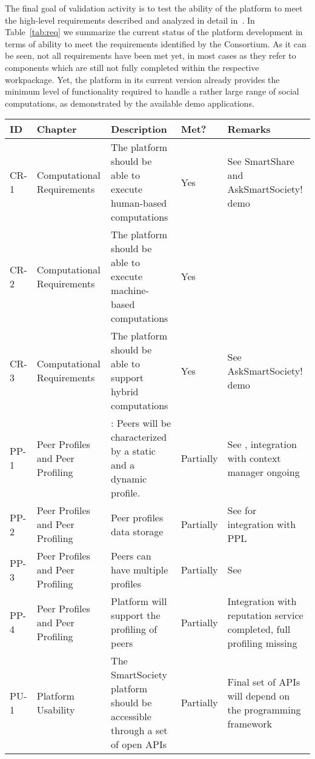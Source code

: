 The final goal of validation activity is to test the ability of the platform to meet the high-level requirements %
described and analyzed in detail in~\cite{D8.1}. In Table~\ref{tab:req} we summarize the current status of the platform development in terms of ability to meet the requirements identified by the Consortium. As it can be seen, not all requirements have been met yet, in most cases as they refer to components which are still not fully completed within the respective workpackage. Yet, the platform in its current version already provides the minimum level of functionality required to handle a rather large range of social computations, as demonstrated by the available demo applications.

\begin{sidewaystable}
{\footnotesize \begin{tabular}{|p{1.2cm}|p{4cm}|p{6.5cm}|p{1.8cm}|p{5.4cm}|}
\hline \hline
ID & Chapter & Description & Met? & Remarks \\
\hline \hline
CR-1 & Computational Requirements & The platform should be able to execute human-based computations & Yes & See SmartShare and AskSmartSociety! demo\\  \hline
CR-2 & Computational Requirements & The platform should be able to execute machine-based computations & Yes & \\ \hline
CR-3 & Computational Requirements & The platform should be able to support hybrid computations & Yes & See AskSmartSociety! demo\\ \hline
PP-1 & Peer Profiles and Peer Profiling &: Peers will be characterized by a static and a dynamic profile. & Partially & See \cite{D4.1,D4.2,D4.3}, integration with context manager ongoing\\ \hline
PP-2 & Peer Profiles and Peer Profiling & Peer profiles data storage & Partially & See \cite{D4.3}  for integration with PPL\\ \hline
PP-3 & Peer Profiles and Peer Profiling & Peers can have multiple profiles & Partially & See \cite{D4.2,D4.3}\\ \hline
PP-4 &Peer Profiles and Peer Profiling  & Platform will support the profiling of peers & Partially & Integration with reputation service completed, full profiling missing\\ \hline
PU-1 & Platform Usability & The SmartSociety platform should be accessible through a set of open APIs & Partially & Final set of APIs will depend on the programming framework~\cite{D7.2} \\ \hline

\end{tabular}}
\end{sidewaystable}
